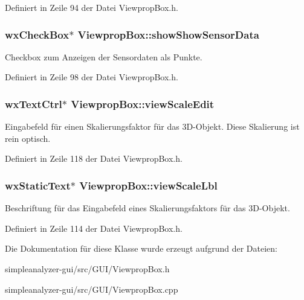 Definiert in Zeile 94 der Datei Viewprop\-Box.\-h.

\hypertarget{classViewpropBox_a731fabc531998315b0850a3b60eb3c51}{
\subsubsection[{show\-Show\-Sensor\-Data}]{\setlength{\rightskip}{0pt plus 5cm}wx\-Check\-Box$\ast$ Viewprop\-Box\-::show\-Show\-Sensor\-Data\hspace{0.3cm}{\ttfamily [private]}}}\label{classViewpropBox_a731fabc531998315b0850a3b60eb3c51}
Checkbox zum Anzeigen der Sensordaten als Punkte. 

Definiert in Zeile 98 der Datei Viewprop\-Box.\-h.

\hypertarget{classViewpropBox_ae275307ddd3a84c91298e78b826f1ae1}{
\subsubsection[{view\-Scale\-Edit}]{\setlength{\rightskip}{0pt plus 5cm}wx\-Text\-Ctrl$\ast$ Viewprop\-Box\-::view\-Scale\-Edit\hspace{0.3cm}{\ttfamily [private]}}}\label{classViewpropBox_ae275307ddd3a84c91298e78b826f1ae1}
Eingabefeld für einen Skalierungsfaktor für das 3\-D-\/\-Objekt. Diese Skalierung ist rein optisch. 

Definiert in Zeile 118 der Datei Viewprop\-Box.\-h.

\hypertarget{classViewpropBox_ab312348ae97369e3b8a1a7ce8ba9e2b1}{
\subsubsection[{view\-Scale\-Lbl}]{\setlength{\rightskip}{0pt plus 5cm}wx\-Static\-Text$\ast$ Viewprop\-Box\-::view\-Scale\-Lbl\hspace{0.3cm}{\ttfamily [private]}}}\label{classViewpropBox_ab312348ae97369e3b8a1a7ce8ba9e2b1}
Beschriftung für das Eingabefeld eines Skalierungsfaktors für das 3\-D-\/\-Objekt. 

Definiert in Zeile 114 der Datei Viewprop\-Box.\-h.



Die Dokumentation für diese Klasse wurde erzeugt aufgrund der Dateien\-:\begin{DoxyCompactItemize}
\item 
simpleanalyzer-\/gui/src/\-G\-U\-I/Viewprop\-Box.\-h\item 
simpleanalyzer-\/gui/src/\-G\-U\-I/Viewprop\-Box.\-cpp\end{DoxyCompactItemize}
